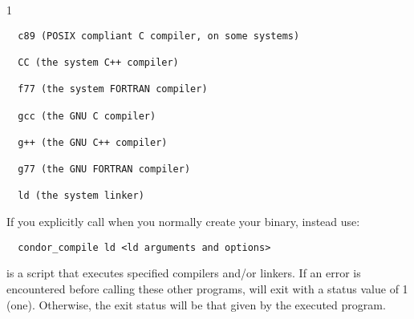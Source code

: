 \begin{ManPage}{\label{man-condor-compile}}{1}
\begin{verbatim}
  c89 (POSIX compliant C compiler, on some systems) 

  CC (the system C++ compiler) 

  f77 (the system FORTRAN compiler) 

  gcc (the GNU C compiler) 

  g++ (the GNU C++ compiler) 

  g77 (the GNU FORTRAN compiler) 

  ld (the system linker) 
\end{verbatim}
\normalsize

\Note If you explicitly call  when you normally create
your binary, instead use:
\footnotesize
\begin{verbatim}
  condor_compile ld <ld arguments and options>
\end{verbatim}
\normalsize

\ExitStatus

 is a script that executes specified compilers and/or linkers.
If an error is encountered before calling these other programs,
 will exit with a status value of 1 (one).
Otherwise, the exit status will be that given by the executed program.

\end{ManPage}
